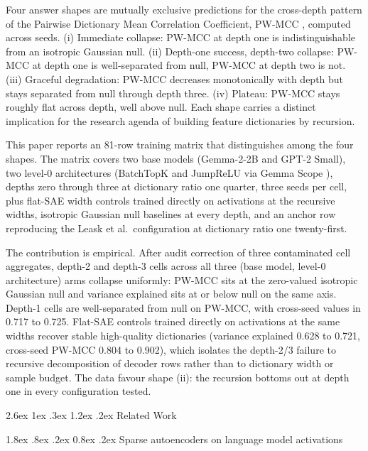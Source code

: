 \documentclass[conference]{IEEEtran}
\makeatletter
\renewcommand\section{\@startsection{section}{1}{\z@}%
   {2.6ex \@plus 1ex \@minus .3ex}%
   {1.2ex \@plus .2ex}%
   {\normalfont\Large\bfseries\centering}}
\renewcommand\subsection{\@startsection{subsection}{2}{\z@}%
   {1.8ex \@plus .8ex \@minus .2ex}%
   {0.8ex \@plus .2ex}%
   {\normalfont\large\bfseries}}
\makeatother
\begin{document}
Four answer shapes are mutually exclusive predictions for the
cross-depth pattern of the Pairwise Dictionary Mean Correlation
Coefficient, PW-MCC \autocite{song2025position}, computed across seeds.
(i) Immediate collapse: PW-MCC at depth one is indistinguishable from an
isotropic Gaussian null. (ii) Depth-one success, depth-two collapse:
PW-MCC at depth one is well-separated from null, PW-MCC at depth two is
not. (iii) Graceful degradation: PW-MCC decreases monotonically with
depth but stays separated from null through depth three. (iv) Plateau:
PW-MCC stays roughly flat across depth, well above null. Each shape
carries a distinct implication for the research agenda of building
feature dictionaries by recursion.

This paper reports an 81-row training matrix that distinguishes among
the four shapes. The matrix covers two base models (Gemma-2-2B and GPT-2
Small), two level-0 architectures (BatchTopK
\autocite{bussmann2024batchtopk} and JumpReLU
\autocite{rajamanoharan2024jumping} via Gemma Scope
\autocite{lieberum2024gemma}), depths zero through three at dictionary
ratio one quarter, three seeds per cell, plus flat-SAE width controls
trained directly on activations at the recursive widths, isotropic
Gaussian null baselines at every depth, and an anchor row reproducing
the Leask et al.~configuration at dictionary ratio one twenty-first.

The contribution is empirical. After audit correction of three
contaminated cell aggregates, depth-2 and depth-3 cells across all three
(base model, level-0 architecture) arms collapse uniformly: PW-MCC sits
at the zero-valued isotropic Gaussian null and variance explained sits
at or below null on the same axis. Depth-1 cells are well-separated from
null on PW-MCC, with cross-seed values in 0.717 to 0.725. Flat-SAE
controls trained directly on activations at the same widths recover
stable high-quality dictionaries (variance explained 0.628 to 0.721,
cross-seed PW-MCC 0.804 to 0.902), which isolates the depth-2/3 failure
to recursive decomposition of decoder rows rather than to dictionary
width or sample budget. The data favour shape (ii): the recursion
bottoms out at depth one in every configuration tested.

\hypertarget{related-work}{%
\section{Related Work}\label{related-work}}

\hypertarget{a.-sparse-autoencoders-on-language-model-activations}{%
\subsection{Sparse autoencoders on language model
activations}\label{a.-sparse-autoencoders-on-language-model-activations}}
\end{document}
